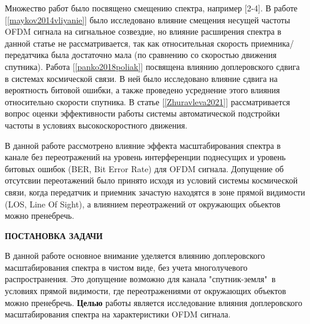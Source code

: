 \newpage
Множество работ было посвящено смещению спектра, например [2-4].
В работе [\ref{maykov2014vliyanie}] было исследовано
влияние смещения несущей частоты OFDM сигнала на сигнальное созвездие,
но влияние расширения спектра в данной статье не рассматривается, так как
относительная скорость приемника/передатчика была достаточно мала 
(по сравнению со скоростью движения спутника). Работа 
[\ref{panko2018poliak}]
посвящена влиянию доплеровского сдвига в системах космической связи.
В ней было исследовано влияние сдвига на вероятность битовой ошибки,
а также проведено усреднение этого влияния относительно скорости спутника.
В статье [\ref{Zhuravleva2021}] рассматривается вопрос оценки
эффективности работы системы автоматической подстройки частоты в условиях
высокоскоростного движения. 


В данной работе рассмотрено влияние эффекта масштабирования спектра
в канале без переотражений на уровень интерференции поднесущих и уровень битовых ошибок
(BER, Bit Error Rate) для OFDM сигнала. Допущение об отсутсвии переотажений было принято
исходя из условий системы космической связи, когда передатчик и приемник зачастую
находятся в зоне прямой видимости (LOS, Line Of Sight), а влиянием переотражений от окружающих
обьектов можно пренебречь.

\newpage
\begin{center}
  \textbf{\large ПОСТАНОВКА ЗАДАЧИ}
\end{center}


В данной работе основное внимание уделяется влиянию
доплеровского масштабирования спектра в чистом виде, без учета многолучевого распространения.
Это допущение возможно для канала "спутник-земля"\ в условиях прямой видимости,
где переотражениями от окружающих объектов можно пренебречь. \textbf{Целью} работы является
исследование влияния доплеровского масштабирования спектра на характеристики OFDM сигнала.

